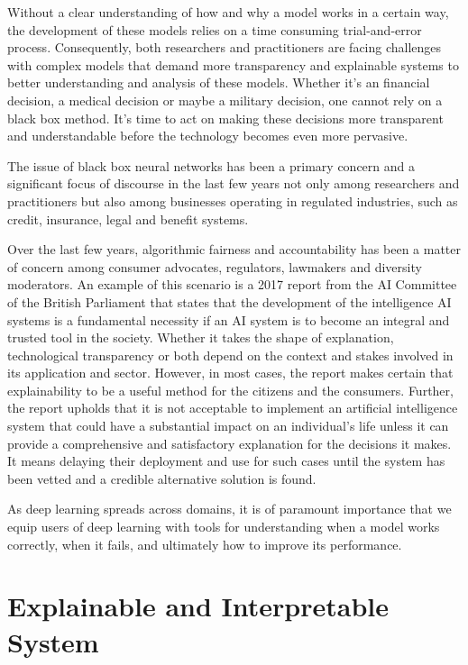 Without a clear understanding of how and why a model works in a certain way, the development of these models relies on a time consuming trial-and-error process. Consequently, both researchers and practitioners are facing challenges with complex models that demand more transparency and explainable systems to better understanding and analysis of these models. Whether it's an financial decision, a medical decision or maybe a military decision, one cannot rely on a black box method. It's time to act on making these decisions more transparent and understandable before the technology becomes even more pervasive.

The issue of black box neural networks has been a primary concern and a significant focus of discourse in the last few years not only among researchers and practitioners \cite{Samek} but also among businesses operating in regulated industries, such as credit, insurance, legal and benefit systems. 

Over the last few years, algorithmic fairness and accountability has been a matter of concern among consumer advocates, regulators, lawmakers and diversity moderators. An example of this scenario is a 2017 report from the AI Committee of the British Parliament \cite{Hagras2018} that states that the development of the intelligence AI systems is a fundamental necessity if an AI system is to become an integral and trusted tool in the society. Whether it takes the shape of explanation, technological transparency or both depend on the context and stakes involved in its application and sector. However, in most cases, the report makes certain that explainability to be a useful method for the citizens and the consumers. Further, the report upholds that it is not acceptable to implement an artificial intelligence system that could have a substantial impact on an individual's life unless it can provide a comprehensive and satisfactory explanation for the decisions it makes. It means delaying their deployment and use for such cases until the system has been vetted and a credible alternative solution is found.

As deep learning spreads across domains, it is of paramount importance that we equip users of deep learning with tools for understanding when a model works correctly, when it fails, and ultimately how to improve its performance.

\section{Explainable and Interpretable System}

